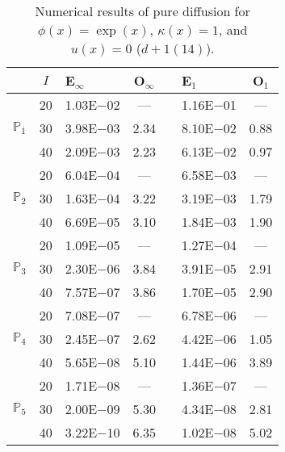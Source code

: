 \begin{table}[H]
\centering
\caption{Numerical results of pure diffusion for $\phi(x)=\exp(x)$, $\kappa(x)=1$, and $u(x)=0$ ($d+1 (14)$).}
\begin{tabular}{@{}l c l c c l c@{}}
\toprule
 & $I$ & E$_{\infty}$ & O$_{\infty}$ && E$_1$ & O$_1$\\
\midrule
\multirow{3}{*}{$\mathbb{P}_{1}$}
 & 20 & 1.03E$-$02 & --- && 1.16E$-$01 & ---\\
 & 30 & 3.98E$-$03 & 2.34 && 8.10E$-$02 & 0.88\\
 & 40 & 2.09E$-$03 & 2.23 && 6.13E$-$02 & 0.97\\
\midrule
\multirow{3}{*}{$\mathbb{P}_{2}$}
 & 20 & 6.04E$-$04 & --- && 6.58E$-$03 & ---\\
 & 30 & 1.63E$-$04 & 3.22 && 3.19E$-$03 & 1.79\\
 & 40 & 6.69E$-$05 & 3.10 && 1.84E$-$03 & 1.90\\
\midrule
\multirow{3}{*}{$\mathbb{P}_{3}$}
 & 20 & 1.09E$-$05 & --- && 1.27E$-$04 & ---\\
 & 30 & 2.30E$-$06 & 3.84 && 3.91E$-$05 & 2.91\\
 & 40 & 7.57E$-$07 & 3.86 && 1.70E$-$05 & 2.90\\
\midrule
\multirow{3}{*}{$\mathbb{P}_{4}$}
 & 20 & 7.08E$-$07 & --- && 6.78E$-$06 & ---\\
 & 30 & 2.45E$-$07 & 2.62 && 4.42E$-$06 & 1.05\\
 & 40 & 5.65E$-$08 & 5.10 && 1.44E$-$06 & 3.89\\
\midrule
\multirow{3}{*}{$\mathbb{P}_{5}$}
 & 20 & 1.71E$-$08 & --- && 1.36E$-$07 & ---\\
 & 30 & 2.00E$-$09 & 5.30 && 4.34E$-$08 & 2.81\\
 & 40 & 3.22E$-$10 & 6.35 && 1.02E$-$08 & 5.02\\
\bottomrule
\end{tabular}
\end{table}